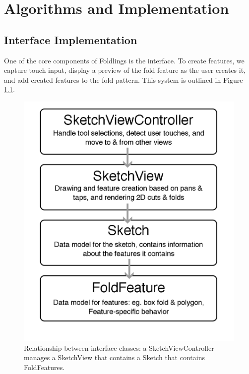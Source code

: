 \chapter{Algorithms and Implementation}

\section{Interface Implementation}\label{interface-implementation}

One of the core components of Foldlings is the interface. To create
features, we capture touch input, display a preview of the fold feature
as the user creates it, and add created features to the fold pattern.
This system is outlined in Figure \ref{mvc}.

\begin{figure}[htbp]
\centering
\includegraphics{figures/40_Tech_Interface_Implementation/sketchview-descendents-thesis-figure.png}
\caption{Relationship between interface classes: a SketchViewController
manages a SketchView that contains a Sketch that contains FoldFeatures.
\label{mvc}}
\end{figure}

